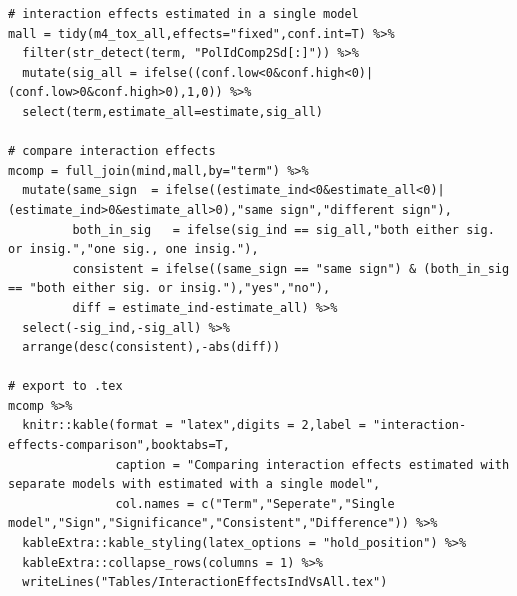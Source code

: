 \documentclass{article}
\begin{document}
\begin{lstlisting}
# interaction effects estimated in a single model
mall = tidy(m4_tox_all,effects="fixed",conf.int=T) %>% 
  filter(str_detect(term, "PolIdComp2Sd[:]")) %>% 
  mutate(sig_all = ifelse((conf.low<0&conf.high<0)|(conf.low>0&conf.high>0),1,0)) %>% 
  select(term,estimate_all=estimate,sig_all)

# compare interaction effects
mcomp = full_join(mind,mall,by="term") %>% 
  mutate(same_sign  = ifelse((estimate_ind<0&estimate_all<0)|(estimate_ind>0&estimate_all>0),"same sign","different sign"),
         both_in_sig   = ifelse(sig_ind == sig_all,"both either sig. or insig.","one sig., one insig."),
         consistent = ifelse((same_sign == "same sign") & (both_in_sig == "both either sig. or insig."),"yes","no"),
         diff = estimate_ind-estimate_all) %>% 
  select(-sig_ind,-sig_all) %>% 
  arrange(desc(consistent),-abs(diff)) 

# export to .tex
mcomp %>% 
  knitr::kable(format = "latex",digits = 2,label = "interaction-effects-comparison",booktabs=T,
               caption = "Comparing interaction effects estimated with separate models with estimated with a single model",
               col.names = c("Term","Seperate","Single model","Sign","Significance","Consistent","Difference")) %>% 
  kableExtra::kable_styling(latex_options = "hold_position") %>% 
  kableExtra::collapse_rows(columns = 1) %>% 
  writeLines("Tables/InteractionEffectsIndVsAll.tex")


\end{lstlisting}
\end{document}
